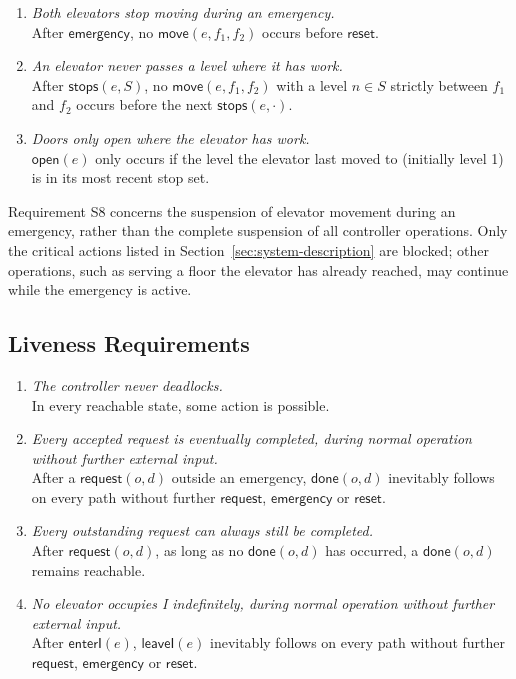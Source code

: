 \begin{enumerate}[label=\textbf{S\arabic*.},leftmargin=3em,itemsep=0.45\baselineskip]
  \item \textit{Both elevators stop moving during an emergency.} \\
  After \(\mathsf{emergency}\), no \(\mathsf{move}(e,f_1,f_2)\) occurs before \(\mathsf{reset}\).
  
  \item \textit{An elevator never passes a level where it has work.} \\
  After \(\mathsf{stops}(e,S)\), no \(\mathsf{move}(e,f_1,f_2)\) with a level \(n\in S\) strictly between \(f_1\) and \(f_2\) occurs before the next \(\mathsf{stops}(e,\cdot)\).
  
  \item \textit{Doors only open where the elevator has work.} \\
  \(\mathsf{open}(e)\) only occurs if the level the elevator last moved to (initially level 1) is in its most recent stop set.
\end{enumerate}

Requirement S8 concerns the suspension of elevator movement during an emergency, rather than the complete suspension of all controller operations. Only the critical actions listed in Section~\ref{sec:system-description} are blocked; other operations, such as serving a floor the elevator has already reached, may continue while the emergency is active.

\subsection{Liveness Requirements}
\begin{enumerate}[label=\textbf{L\arabic*.},leftmargin=3em,itemsep=0.45\baselineskip]
  \item \textit{The controller never deadlocks.} \\
  In every reachable state, some action is possible.
  
  \item \textit{Every accepted request is eventually completed, during normal operation without further external input.} \\
  After a \(\mathsf{request}(o,d)\) outside an emergency, \(\mathsf{done}(o,d)\) inevitably follows on every path without further \(\mathsf{request}\), \(\mathsf{emergency}\) or \(\mathsf{reset}\).
  
  \item \textit{Every outstanding request can always still be completed.} \\
  After \(\mathsf{request}(o,d)\), as long as no \(\mathsf{done}(o,d)\) has occurred, a \(\mathsf{done}(o,d)\) remains reachable.
  
  \item \textit{No elevator occupies I indefinitely, during normal operation without further external input.} \\
  After \(\mathsf{enterI}(e)\), \(\mathsf{leaveI}(e)\) inevitably follows on every path without further \(\mathsf{request}\), \(\mathsf{emergency}\) or \(\mathsf{reset}\).
\end{enumerate}

